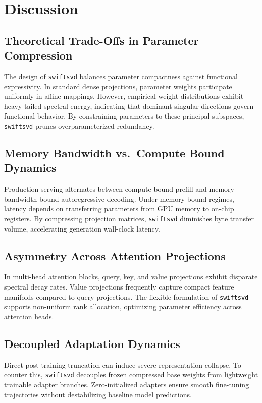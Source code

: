 \section{Discussion}

\subsection{Theoretical Trade-Offs in Parameter Compression}
The design of \texttt{swiftsvd} balances parameter compactness against functional expressivity. In standard dense projections, parameter weights participate uniformly in affine mappings. However, empirical weight distributions exhibit heavy-tailed spectral energy, indicating that dominant singular directions govern functional behavior. By constraining parameters to these principal subspaces, \texttt{swiftsvd} prunes overparameterized redundancy.

\subsection{Memory Bandwidth vs.\ Compute Bound Dynamics}
Production serving alternates between compute-bound prefill and memory-bandwidth-bound autoregressive decoding. Under memory-bound regimes, latency depends on transferring parameters from GPU memory to on-chip registers. By compressing projection matrices, \texttt{swiftsvd} diminishes byte transfer volume, accelerating generation wall-clock latency.

\subsection{Asymmetry Across Attention Projections}
In multi-head attention blocks, query, key, and value projections exhibit disparate spectral decay rates. Value projections frequently capture compact feature manifolds compared to query projections. The flexible formulation of \texttt{swiftsvd} supports non-uniform rank allocation, optimizing parameter efficiency across attention heads.

\subsection{Decoupled Adaptation Dynamics}
Direct post-training truncation can induce severe representation collapse. To counter this, \texttt{swiftsvd} decouples frozen compressed base weights from lightweight trainable adapter branches. Zero-initialized adapters ensure smooth fine-tuning trajectories without destabilizing baseline model predictions.

